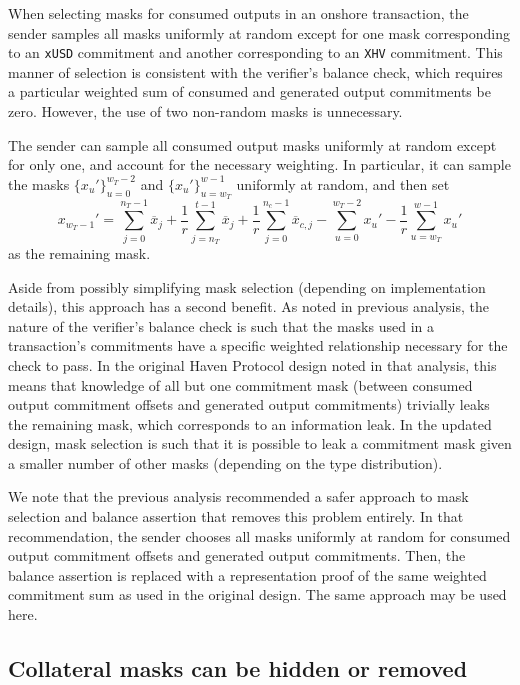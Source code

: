 \documentclass{article}
\begin{document}
When selecting masks for consumed outputs in an onshore transaction, the sender samples all masks uniformly at random except for one mask corresponding to an \texttt{xUSD} commitment and another corresponding to an \texttt{XHV} commitment.
This manner of selection is consistent with the verifier's balance check, which requires a particular weighted sum of consumed and generated output commitments be zero.
However, the use of two non-random masks is unnecessary.

The sender can sample all consumed output masks uniformly at random except for only one, and account for the necessary weighting.
In particular, it can sample the masks $\{x_u'\}_{u=0}^{w_T-2}$ and $\{x_u'\}_{u=w_T}^{w-1}$ uniformly at random, and then set
$$x_{w_T-1}' = \sum_{j=0}^{n_T-1} \overline{x}_j + \frac{1}{r} \sum_{j=n_T}^{t-1} \overline{x}_j + \frac{1}{r} \sum_{j=0}^{n_c-1} \overline{x}_{c,j} - \sum_{u=0}^{w_T-2} x_u' - \frac{1}{r} \sum_{u=w_T}^{w-1} x_u'$$
as the remaining mask.

Aside from possibly simplifying mask selection (depending on implementation details), this approach has a second benefit.
As noted in previous analysis, the nature of the verifier's balance check is such that the masks used in a transaction's commitments have a specific weighted relationship necessary for the check to pass.
In the original Haven Protocol design noted in that analysis, this means that knowledge of all but one commitment mask (between consumed output commitment offsets and generated output commitments) trivially leaks the remaining mask, which corresponds to an information leak.
In the updated design, mask selection is such that it is possible to leak a commitment mask given a smaller number of other masks (depending on the type distribution).

We note that the previous analysis recommended a safer approach to mask selection and balance assertion that removes this problem entirely.
In that recommendation, the sender chooses all masks uniformly at random for consumed output commitment offsets and generated output commitments.
Then, the balance assertion is replaced with a representation proof of the same weighted commitment sum as used in the original design.
The same approach may be used here.


\subsection{Collateral masks can be hidden or removed}
\end{document}
